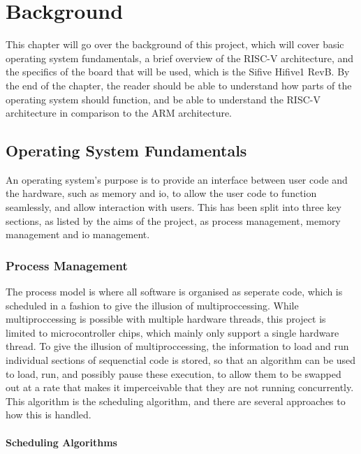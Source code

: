 \chapter[Background]{Background}
\label{cha:backgr}
This chapter will go over the background of this project, which will cover basic operating system fundamentals, a brief overview of the RISC-V architecture, and the specifics of the board that will be used, which is the Sifive Hifive1 RevB. By the end of the chapter, the reader should be able to understand how parts of the operating system should function, and be able to understand the RISC-V architecture in comparison to the ARM architecture.
\section{Operating System Fundamentals}
An operating system's purpose is to provide an interface between user code and the hardware, such as memory and \ac{io}, to allow the user code to function seamlessly, and allow interaction with users. This has been split into three key sections, as listed by the aims of the project, as process management, memory management and \ac{io} management.\cite{modern_operating}
\subsection{Process Management}
The process model is where all software is organised as seperate code, which is scheduled in a fashion to give the illusion of multiproccessing. While multiproccessing is possible with multiple hardware threads, this project is limited to microcontroller chips, which mainly only support a single hardware thread. To give the illusion of multiproccessing, the information to load and run individual sections of sequenctial code is stored, so that an algorithm can be used to load, run, and possibly pause these execution, to allow them to be swapped out at a rate that makes it imperceivable that they are not running concurrently. This algorithm is the scheduling algorithm, and there are several approaches to how this is handled.\cite{modern_operating}
\subsubsection{Scheduling Algorithms}

